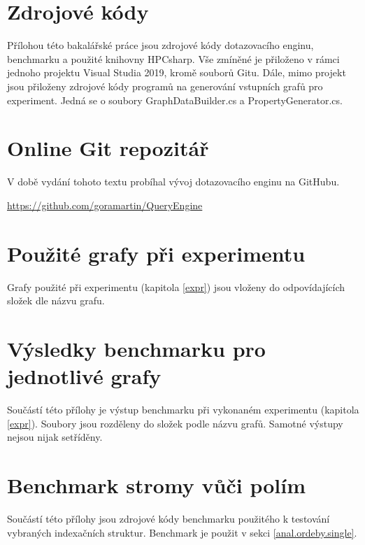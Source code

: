 \section{Zdrojové kódy}
\label{prilohy.kod}

Přílohou této bakalářské práce jsou zdrojové kódy dotazovacího enginu, benchmarku a použité knihovny HPCsharp.
Vše zmíněné je přiloženo v rámci jednoho projektu Visual Studia 2019, kromě souborů Gitu. Dále, mimo projekt jsou přiloženy
zdrojové kódy programů na generování vstupních grafů pro experiment. Jedná se o soubory GraphDataBuilder.cs a PropertyGenerator.cs.

\section{Online Git repozitář}
\label{prilohy.repo}

V době vydání tohoto textu probíhal vývoj dotazovacího enginu na GitHubu.

\begin{center}
\url{https://github.com/goramartin/QueryEngine}
\end{center}

\section{Použité grafy při experimentu}
\label{prilohy.grafy}

Grafy použité při experimentu (kapitola \ref{expr}) jsou vloženy do odpovídajících složek dle názvu grafu. 

\section{Výsledky benchmarku pro jednotlivé grafy}
\label{prilohy.grafyVysledky}

Součástí této přílohy je výstup benchmarku při vykonaném experimentu (kapitola \ref{expr}).
Soubory jsou rozděleny do složek podle názvu grafů.
Samotné výstupy nejsou nijak setříděny.

\section{Benchmark stromy vůči polím}
\label{prilohy.benchtreevsarray}

Součástí této přílohy jsou zdrojové kódy benchmarku použitého k testování vybraných indexačních struktur.
Benchmark je použit v sekci \ref{anal.ordeby.single}.